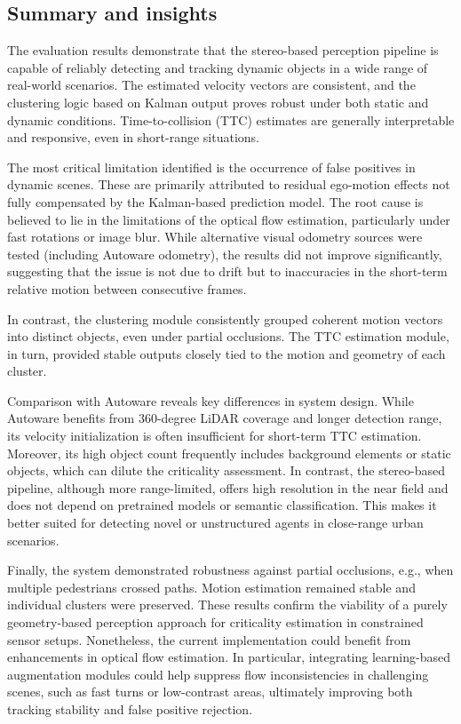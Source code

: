 \subsection{Summary and insights}

The evaluation results demonstrate that the stereo-based perception 
pipeline is capable of reliably detecting and tracking dynamic objects 
in a wide range of real-world scenarios. The estimated velocity vectors 
are consistent, and the clustering logic based on Kalman output 
proves robust under both static and dynamic conditions. Time-to-collision 
(TTC) estimates are generally interpretable and responsive, even 
in short-range situations.

The most critical limitation identified is the occurrence of false positives 
in dynamic scenes. These are primarily attributed to residual ego-motion 
effects not fully compensated by the Kalman-based prediction model. 
The root cause is believed to lie in the limitations of the optical flow 
estimation, particularly under fast rotations or image blur. While 
alternative visual odometry sources were tested (including Autoware 
odometry), the results did not improve significantly, suggesting that 
the issue is not due to drift but to inaccuracies in the short-term 
relative motion between consecutive frames.

In contrast, the clustering module consistently grouped coherent motion 
vectors into distinct objects, even under partial occlusions. The TTC estimation module, in turn, provided stable outputs 
closely tied to the motion and geometry of each cluster.

Comparison with Autoware reveals key differences in system design. 
While Autoware benefits from 360-degree LiDAR coverage and longer 
detection range, its velocity initialization is often insufficient for 
short-term TTC estimation. Moreover, its high object count frequently 
includes background elements or static objects, which can dilute the 
criticality assessment. In contrast, the stereo-based pipeline, although 
more range-limited, offers high resolution in the near field and does 
not depend on pretrained models or semantic classification. This makes 
it better suited for detecting novel or unstructured agents in close-range 
urban scenarios.

Finally, the system demonstrated robustness against partial occlusions, 
e.g., when multiple pedestrians crossed paths. Motion estimation 
remained stable and individual clusters were preserved. These results 
confirm the viability of a purely geometry-based perception approach 
for criticality estimation in constrained sensor setups. Nonetheless, the 
current implementation could benefit from enhancements in optical 
flow estimation. In particular, integrating learning-based augmentation 
modules could help suppress flow inconsistencies in challenging scenes, 
such as fast turns or low-contrast areas, ultimately improving both 
tracking stability and false positive rejection.

